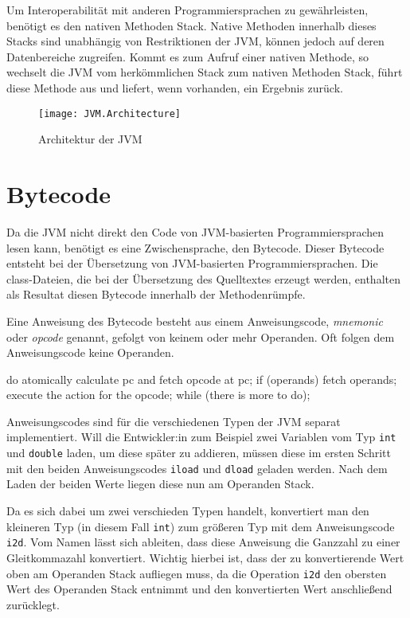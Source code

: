 Um Interoperabilität mit anderen Programmiersprachen zu gewährleisten, benötigt es den nativen Methoden Stack. Native Methoden innerhalb dieses Stacks sind unabhängig von Restriktionen der JVM, können jedoch auf deren Datenbereiche zugreifen. Kommt es zum Aufruf einer nativen Methode, so wechselt die JVM vom herkömmlichen Stack zum nativen Methoden Stack, führt diese Methode aus und liefert, wenn vorhanden, ein Ergebnis zurück.

\begin{figure}
    \caption{Architektur der JVM}
    \centering
    \texttt{[image: JVM.Architecture]}
    \label{fig:jvm-architecture}
\end{figure}

\section{Bytecode}

Da die JVM nicht direkt den Code von JVM-basierten Programmiersprachen lesen kann, benötigt es eine Zwischensprache, den Bytecode. Dieser Bytecode entsteht bei der Übersetzung von JVM-basierten Programmiersprachen. Die class-Dateien, die bei der Übersetzung des Quelltextes erzeugt werden, enthalten als Resultat diesen Bytecode innerhalb der Methodenrümpfe.

Eine Anweisung des Bytecode besteht aus einem Anweisungscode, \textit{mnemonic} oder \textit{opcode} genannt, gefolgt von keinem oder mehr Operanden. Oft folgen dem Anweisungscode keine Operanden.

\begin{JavaCode}[numbers=none, caption={Auszug aus der JVM Spezifikation, welche die Interpretationsschleife für Bytecode repräsentiert.}]
do {
    atomically calculate pc and fetch opcode at pc;
    if (operands) fetch operands;
    execute the action for the opcode;
} while (there is more to do);

\end{JavaCode}

Anweisungscodes sind für die verschiedenen Typen der JVM separat implementiert. Will die Entwickler:in zum Beispiel zwei Variablen vom Typ \texttt{int} und \texttt{double} laden, um diese später zu addieren, müssen diese im ersten Schritt mit den beiden Anweisungscodes \texttt{iload} und \texttt{dload} geladen werden. Nach dem Laden der beiden Werte liegen diese nun am Operanden Stack. 

Da es sich dabei um zwei verschieden Typen handelt, konvertiert man den kleineren Typ (in diesem Fall \texttt{int}) zum größeren Typ mit dem Anweisungscode \texttt{i2d}. Vom Namen lässt sich ableiten, dass diese Anweisung die Ganzzahl zu einer Gleitkommazahl konvertiert. Wichtig hierbei ist, dass der zu konvertierende Wert oben am Operanden Stack aufliegen muss, da die Operation \texttt{i2d} den obersten Wert des Operanden Stack entnimmt und den konvertierten Wert anschließend zurücklegt.


